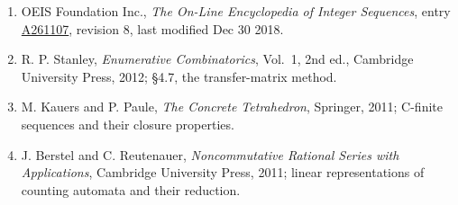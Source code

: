 \documentclass[11pt]{article}
\theoremstyle{definition}
\begin{document}
\begin{enumerate}

\item OEIS Foundation Inc., \emph{The On-Line Encyclopedia of Integer Sequences}, entry \href{https://oeis.org/A261107}{A261107}, revision 8, last modified Dec 30 2018.

\item R. P. Stanley, \emph{Enumerative Combinatorics}, Vol.~1, 2nd ed., Cambridge University Press, 2012; \S4.7, the transfer-matrix method.

\item M. Kauers and P. Paule, \emph{The Concrete Tetrahedron}, Springer, 2011; C-finite sequences and their closure properties.

\item J. Berstel and C. Reutenauer, \emph{Noncommutative Rational Series with Applications}, Cambridge University Press, 2011; linear representations of counting automata and their reduction.

\end{enumerate}
\end{document}
